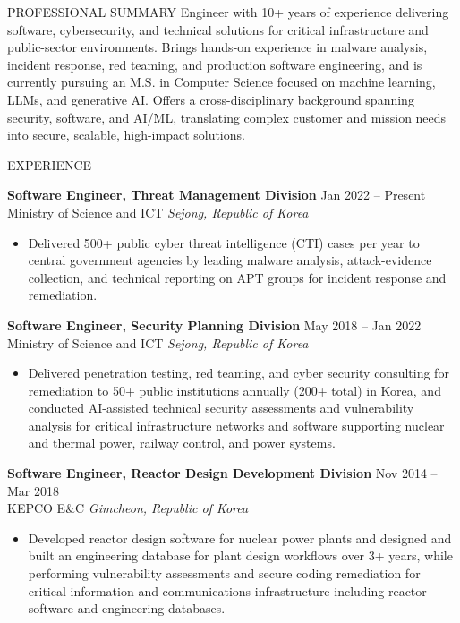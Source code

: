 \documentclass{resume}
\begin{document}
\small

\begin{rSection}{PROFESSIONAL SUMMARY}
Engineer with 10+ years of experience delivering software, cybersecurity, and technical solutions for critical infrastructure and public-sector environments. Brings hands-on experience in malware analysis, incident response, red teaming, and production software engineering, and is currently pursuing an M.S. in Computer Science focused on machine learning, LLMs, and generative AI. Offers a cross-disciplinary background spanning security, software, and AI/ML, translating complex customer and mission needs into secure, scalable, high-impact solutions.
\end{rSection}

\begin{rSection}{EXPERIENCE}

\textbf{Software Engineer, Threat Management Division} \hfill Jan 2022 -- Present\\
Ministry of Science and ICT \hfill \textit{Sejong, Republic of Korea}
\begin{itemize}
    \itemsep -4pt {}
    \item Delivered 500+ public cyber threat intelligence (CTI) cases per year to central government agencies by leading malware analysis, attack-evidence collection, and technical reporting on APT groups for incident response and remediation.
\end{itemize}

\textbf{Software Engineer, Security Planning Division} \hfill May 2018 -- Jan 2022\\
Ministry of Science and ICT \hfill \textit{Sejong, Republic of Korea}
\begin{itemize}
    \itemsep -4pt {}
    \item Delivered penetration testing, red teaming, and cyber security consulting for remediation to 50+ public institutions annually (200+ total) in Korea, and conducted AI-assisted technical security assessments and vulnerability analysis for critical infrastructure networks and software supporting nuclear and thermal power, railway control, and power systems.
\end{itemize}

\textbf{Software Engineer, Reactor Design Development Division} \hfill Nov 2014 -- Mar 2018\\
KEPCO E\&C \hfill \textit{Gimcheon, Republic of Korea}
\begin{itemize}
    \itemsep -4pt {}
    \item Developed reactor design software for nuclear power plants and designed and built an engineering database for plant design workflows over 3+ years, while performing vulnerability assessments and secure coding remediation for critical information and communications infrastructure including reactor software and engineering databases.
\end{itemize}

\end{rSection}
\end{document}
